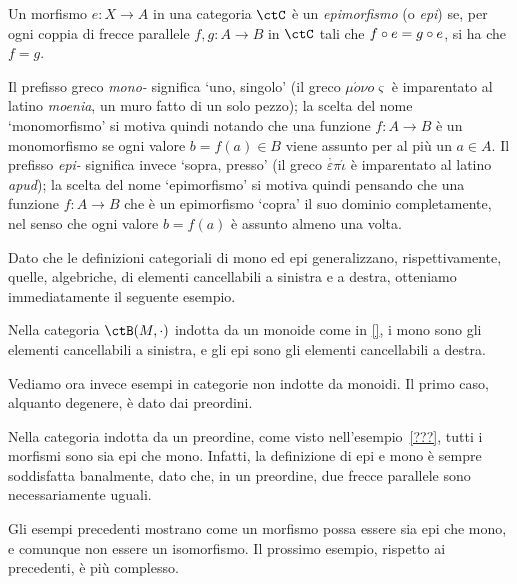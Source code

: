 \begin{definition}[Epimorfismo]\label{def_Epi}
	Un morfismo \(e \colon X \to A\) in una categoria \(\ctC\) è un \emph{epimorfismo} (o \emph{epi}) se,
	per ogni coppia di frecce parallele \(f, g \colon A \to B\) in \(\ctC\) tali che \(f \circ e = g \circ e\), si ha che \(f = g\).
\end{definition}
\begin{remark}
	Il prefisso greco \emph{mono-} significa `uno, singolo' (il greco $\mu\acute{o}\nu o\varsigma$ è imparentato al latino \emph{moenia}, un muro fatto di un solo pezzo); la scelta del nome `monomorfismo' si motiva quindi notando che una funzione $f : A\to B$ è un monomorfismo se ogni valore $b=f(a) \in B$ viene assunto per al più un $a\in A$. Il prefisso \emph{epi-} significa invece `sopra, presso' (il greco $\overset,\varepsilon\pi\acute{\iota}$ è imparentato al latino \emph{apud}); la scelta del nome `epimorfismo' si motiva quindi pensando che una funzione $f : A\to B$ che è un epimorfismo `copra' il suo dominio completamente, nel senso che ogni valore $b=f(a)$ è assunto almeno una volta.
\end{remark}
Dato che le definizioni categoriali di mono ed epi generalizzano, rispettivamente, quelle, algebriche, di elementi cancellabili a sinistra e a destra, otteniamo immediatamente il seguente esempio.
\begin{example}
	Nella categoria $\ctB(M,\cdot)$ indotta da un monoide come in \ref{}, i mono sono gli elementi cancellabili a sinistra,
	e gli epi sono gli elementi cancellabili a destra.
\end{example}

Vediamo ora invece esempi in categorie non indotte da monoidi.
Il primo caso, alquanto degenere, è dato dai preordini.

\begin{example}
	Nella categoria indotta da un preordine, come visto nell'esempio~\ref{???},
	tutti i morfismi sono sia epi che mono.
	Infatti, la definizione di epi e mono è sempre soddisfatta banalmente,
	dato che, in un preordine, due frecce parallele sono necessariamente uguali.
\end{example}

Gli esempi precedenti mostrano come
un morfismo possa essere sia epi che mono, e comunque non essere un isomorfismo.
Il prossimo esempio, rispetto ai precedenti, è più complesso.

